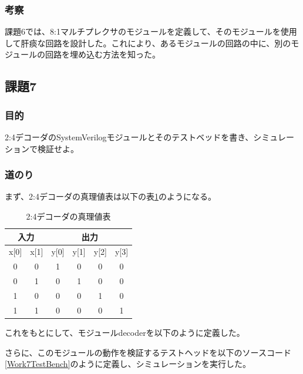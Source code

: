 \documentclass[a4paper]{jarticle}
\begin{document}
\subsubsection{考察}
課題6では、8:1マルチプレクサのモジュールを定義して、そのモジュールを使用して肝痰な回路を設計した。これにより、あるモジュールの回路の中に、別のモジュールの回路を埋め込む方法を知った。
\subsection{課題7}
\subsubsection{目的}
2:4デコーダのSystemVerilogモジュールとそのテストベッドを書き、シミュレーションで検証せよ。
\subsubsection{道のり}
まず、2:4デコーダの真理値表は以下の表\ref{Work7TruthTable}のようになる。
\begin{table}[ht]
	\begin{center}
		\caption{2:4デコーダの真理値表}
		\label{Work7TruthTable}
		\begin{tabular}{|c|c||c|c|c|c|}
			\hline
			\multicolumn{2}{|c|}{入力} & \multicolumn{4}{|c|}{出力}\\	\hline\hline
			x[0]	&x[1]	&y[0]	&y[1]	&y[2]	&y[3]\\	\hline\hline
			0	&0	&1	&0	&0	&0\\	\hline
			0	&1	&0	&1	&0	&0\\	\hline
			1	&0	&0	&0	&1	&0\\	\hline
			1	&1	&0	&0	&0	&1\\	\hline
		\end{tabular}
	\end{center}
\end{table}
これをもとにして、モジュールdecoderを以下のように定義した。

さらに、このモジュールの動作を検証するテストヘッドを以下のソースコード\ref{Work7TestBench}のように定義し、シミュレーションを実行した。

\end{document}

